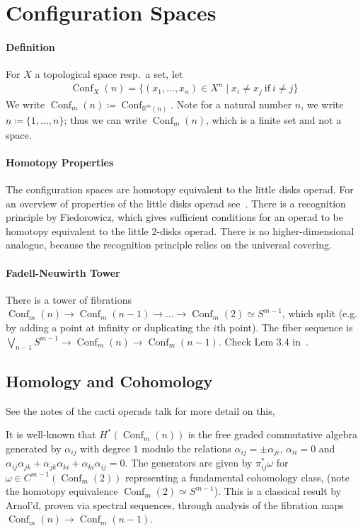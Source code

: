 \documentclass{scrartcl}
\theoremstyle{plain}
\theoremstyle{definition}
\newcommand{\R}{\mathbb R}
\newcommand{\defeq}{\coloneqq}
\DeclareMathOperator{\Conf}{Conf}
\begin{document}
\tableofcontents

\section{Configuration Spaces}

\paragraph{Definition} For $X$ a topological space resp.\ a set, let
\begin{align*}
    \Conf_X(n) = \{(x_1,\dots, x_n)\in X^n \mid x_i \neq x_j\ \text{if}\ i\neq j\}
\end{align*}
We write $\Conf_m(n) \coloneqq \Conf_{\R^m(n)}$. Note for a natural number $n$, we write $\underline n \defeq \{1, \dots, n\}$; thus we can write $\Conf_{\underline m}(n)$, which is a finite set and not a space. 

\paragraph{Homotopy Properties} The configuration spaces are homotopy equivalent to the little disks operad. For an overview of properties of the little disks operad see~\cite{fresse2017homotopy}. There is a recognition principle by Fiedorowicz, which gives sufficient conditions for an operad to be homotopy equivalent to the little 2-disks operad. There is no higher-dimensional analogue, because the recognition principle relies on the universal covering. 

\paragraph{Fadell-Neuwirth Tower} There is a tower of fibrations $\Conf_m(n) \to \Conf_m(n-1) \to \dots \to \Conf_m(2) \simeq S^{m-1}$, which split (e.g. by adding a point at infinity or duplicating the $i$th point). The fiber sequence is $\bigvee_{n-1} S^{m-1} \to \Conf_m(n) \to \Conf_m(n-1)$. Check Lem 3.4 in~\cite{sinha2010homology}. 

\subsection{Homology and Cohomology} 
See the notes of the cacti operads talk for more detail on this, 

It is well-known that $H^*(\Conf_m(n))$ is the free graded commutative algebra generated by $\alpha_{ij}$ with degree $1$ modulo the relations $\alpha_{ij} = \pm\alpha_{ji}$, $\alpha_{ii}=0$ and $\alpha_{ij}\alpha_{jk} + \alpha_{jk}\alpha_{ki} + \alpha_{ki}\alpha_{ij} = 0$. The generators are given by $\pi_{ij}^*\omega$ for $\omega\in C^{m-1}(\Conf_m(2))$ representing a fundamental cohomology class, (note the homotopy equivalence $\Conf_m(2)\simeq S^{m-1}$). This is a classical result by Arnol'd, proven via spectral sequences, through analysis of the fibration maps $\Conf_m(n) \to \Conf_m(n-1)$. 
\end{document}
